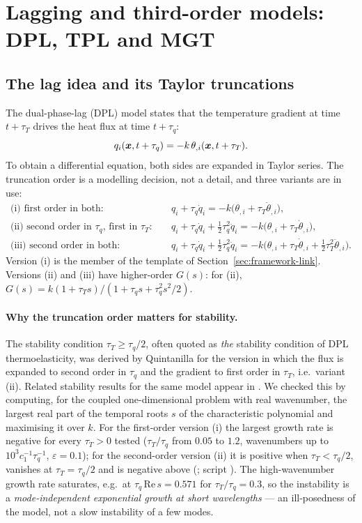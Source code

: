 \section{Lagging and third-order models: DPL, TPL and MGT}\label{sec:lags}
\subsection{The lag idea and its Taylor truncations}
The dual-phase-lag (DPL) model \citep{Tzou1995,Tzou1997} states that the temperature gradient at time $t+\tau_T$ drives the heat flux at time $t+\tau_q$:
\begin{equation}
q_i(\bm x,t+\tau_q)=-k\,\theta_{,i}(\bm x,t+\tau_T).\label{eq:lag}
\end{equation}
To obtain a differential equation, both sides are expanded in Taylor series. The truncation order is a modelling decision, not a detail, and three variants are in use:
\begin{align}
\text{(i) first order in both:}\quad & q_i+\tau_q\dot q_i=-k\bigl(\theta_{,i}+\tau_T\dot\theta_{,i}\bigr),\label{eq:dpl1}\\
\text{(ii) second order in }\tau_q\text{, first in }\tau_T:\quad & q_i+\tau_q\dot q_i+\tfrac12\tau_q^2\ddot q_i=-k\bigl(\theta_{,i}+\tau_T\dot\theta_{,i}\bigr),\label{eq:dpl2}\\
\text{(iii) second order in both:}\quad & q_i+\tau_q\dot q_i+\tfrac12\tau_q^2\ddot q_i=-k\bigl(\theta_{,i}+\tau_T\dot\theta_{,i}+\tfrac12\tau_T^2\ddot\theta_{,i}\bigr).\label{eq:dpl3}
\end{align}
Version (i) is the member of the template of Section~\ref{sec:framework-link}. Versions (ii) and (iii) have higher-order $G(s)$: for (ii), $G(s)=k(1+\tau_Ts)/(1+\tau_qs+\tau_q^2s^2/2)$.

\paragraph{Why the truncation order matters for stability.} The stability condition $\tau_T\ge\tau_q/2$, often quoted as \emph{the} stability condition of DPL thermoelasticity, was derived by Quintanilla \citep{Quintanilla2003DPL} for the version in which the flux is expanded to second order in $\tau_q$ and the gradient to first order in $\tau_T$, i.e.\ variant (ii). Related stability results for the same model appear in \citep{Quintanilla2002b,Quintanilla2006,Fabrizio2014,Rukolaine2014}. We checked this by computing, for the coupled one-dimensional problem with real wavenumber, the largest real part of the temporal roots $s$ of the characteristic polynomial and maximising it over $k$. For the first-order version (i) the largest growth rate is negative for every $\tau_T>0$ tested ($\tau_T/\tau_q$ from $0.05$ to $1.2$, wavenumbers up to $10^3c_1^{-1}\tau_q^{-1}$, $\varepsilon=0.1$); for the second-order version (ii) it is positive when $\tau_T<\tau_q/2$, vanishes at $\tau_T=\tau_q/2$ and is negative above (; script ). The high-wavenumber growth rate saturates, e.g.\ at $\tau_q\,\mathrm{Re}\,s=0.571$ for $\tau_T/\tau_q=0.3$, so the instability is a \emph{mode-independent exponential growth at short wavelengths} --- an ill-posedness of the model, not a slow instability of a few modes.

